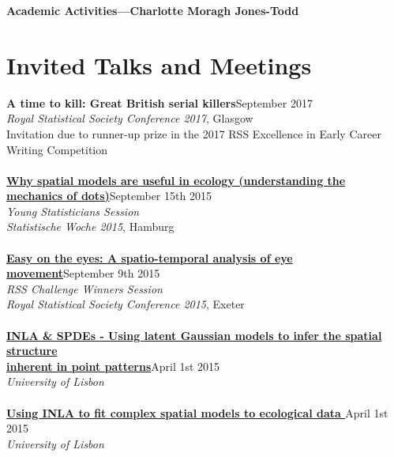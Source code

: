 \documentclass[10pt,letter]{article}
\begin{document}
\LARGE{\textbf{Academic Activities---Charlotte Moragh Jones-Todd}}

\normalsize

  \noindent\makebox[\linewidth]{\rule{\paperwidth}{0.4pt}}

\section*{Invited Talks and Meetings}
 \vspace{1mm}
        {\textbf{A time to kill: Great British serial killers}}\hfill  September 2017\\
        {\sl Royal Statistical Society Conference 2017}, Glasgow\\
        Invitation due to runner-up prize in the 2017 RSS Excellence in Early Career Writing Competition\\
\hdashrule[0.5ex]{4cm}{1pt}{1pt}\\
\href{https://drive.google.com/file/d/0B03uSZ5TT4NYWUJPMHpKdWpkdTQ/view?usp=sharing}{\textbf{Why spatial models are useful in ecology (understanding the \\
mechanics of dots)}}\hfill September 15th 2015\\
\textit{Young Statisticians Session}\\
 {\sl Statistische Woche 2015}, Hamburg\\
 \hdashrule[0.5ex]{4cm}{1pt}{1pt}\\ \href{https://drive.google.com/file/d/0B03uSZ5TT4NYZkFpU3Zwd2RqSHM/view?usp=sharing}{\textbf{Easy on the eyes: A spatio-temporal analysis of eye movement}}\hfill September 9th 2015\\
 \textit{RSS Challenge Winners Session}\\
 {\sl Royal Statistical Society Conference 2015}, Exeter\\
 \hdashrule[0.5ex]{4cm}{1pt}{1pt}\\
\href{https://drive.google.com/file/d/0B03uSZ5TT4NYanE4N2N6THMtZ28/view?usp=sharing} {\textbf{INLA \& SPDEs - 
Using latent Gaussian models to infer the spatial structure \\
inherent in point patterns}}\hfill April 1st 2015\\
 {\sl University of Lisbon}\\
 \hdashrule[0.5ex]{4cm}{1pt}{1pt}\\
 {\textbf{\href{http://www.startfactor.pt/training1.html}{Using INLA to fit complex spatial models to ecological data }}} \hfill April 1st 2015\\
 {\sl University of Lisbon}\\
\end{document}
